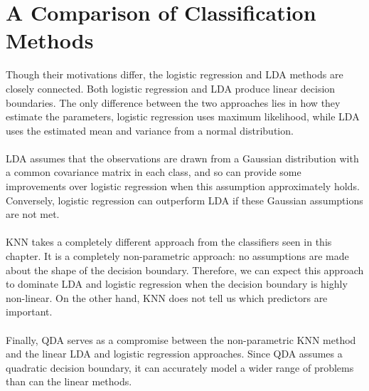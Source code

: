 \section{A Comparison of Classification Methods}
Though their motivations differ, the logistic regression and LDA methods are closely connected. Both logistic regression and LDA produce linear decision boundaries. The only difference between the two approaches lies in how they estimate the parameters, logistic regression uses maximum likelihood, while LDA uses the estimated mean and variance from a normal distribution.
\\\\
LDA assumes that the observations are drawn from a Gaussian distribution with a common covariance matrix in each class, and so can provide some improvements over logistic regression when this assumption approximately holds. Conversely, logistic regression can outperform LDA if these Gaussian assumptions are not met.\\\\
KNN takes a completely different approach from the classifiers seen in this chapter. It is a completely non-parametric approach: no assumptions are made about the shape of the decision boundary. Therefore, we can expect this approach to dominate LDA and logistic regression when the decision boundary is highly non-linear. On the other hand, KNN does not tell us which predictors are important.\\\\
Finally, QDA serves as a compromise between the non-parametric KNN method and the linear LDA and logistic regression approaches. Since QDA assumes a quadratic decision boundary, it can accurately model a wider range of problems than can the linear methods.
